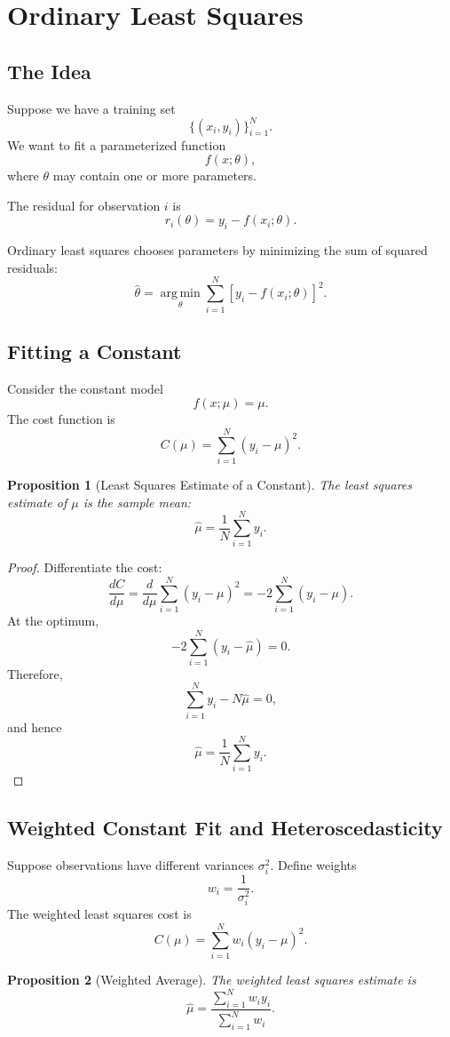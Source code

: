 \documentclass[12pt,oneside]{book}
\numberwithin{equation}{section}
\theoremstyle{definition}
\theoremstyle{plain}
\newtheorem{proposition}{Proposition}[section]
\theoremstyle{remark}
\newcommand{\argmin}{\operatorname*{arg\,min}}
\begin{document}
\section{Ordinary Least Squares}

\subsection{The Idea}

Suppose we have a training set
\[
\{(x_i,y_i)\}_{i=1}^N.
\]
We want to fit a parameterized function
\[
f(x;\theta),
\]
where $\theta$ may contain one or more parameters.

The residual for observation $i$ is
\[
r_i(\theta)=y_i-f(x_i;\theta).
\]

Ordinary least squares chooses parameters by minimizing the sum of squared residuals:
\[
\hat{\theta}
=
\argmin_{\theta}
\sum_{i=1}^N
\left[y_i-f(x_i;\theta)\right]^2.
\]

\subsection{Fitting a Constant}

Consider the constant model
\[
f(x;\mu)=\mu.
\]
The cost function is
\[
C(\mu)
=
\sum_{i=1}^N (y_i-\mu)^2.
\]

\begin{proposition}[Least Squares Estimate of a Constant]
The least squares estimate of $\mu$ is the sample mean:
\[
\hat{\mu}
=
\frac{1}{N}\sum_{i=1}^N y_i.
\]
\end{proposition}

\begin{proof}
Differentiate the cost:
\[
\frac{dC}{d\mu}
=
\frac{d}{d\mu}
\sum_{i=1}^N (y_i-\mu)^2
=
-2\sum_{i=1}^N (y_i-\mu).
\]
At the optimum,
\[
-2\sum_{i=1}^N (y_i-\hat{\mu})=0.
\]
Therefore,
\[
\sum_{i=1}^N y_i - N\hat{\mu}=0,
\]
and hence
\[
\hat{\mu}
=
\frac{1}{N}\sum_{i=1}^N y_i.
\]
\end{proof}

\subsection{Weighted Constant Fit and Heteroscedasticity}

Suppose observations have different variances $\sigma_i^2$. Define weights
\[
w_i=\frac{1}{\sigma_i^2}.
\]
The weighted least squares cost is
\[
C(\mu)
=
\sum_{i=1}^N w_i(y_i-\mu)^2.
\]

\begin{proposition}[Weighted Average]
The weighted least squares estimate is
\[
\hat{\mu}
=
\frac{\sum_{i=1}^N w_i y_i}{\sum_{i=1}^N w_i}.
\]
\end{proposition}
\end{document}
